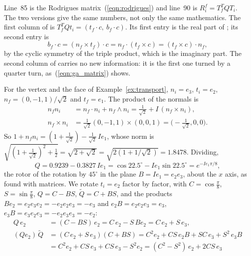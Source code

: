 Line~85 is the Rodrigues matrix~(\ref{eqn:rodrigues}) and line~90 is $R_i^f = T_f^T Q T_i$. The two versions give the same numbers, not only the same mathematics. The first column of  is $T_f^T Q t_i = (t_f\cdot c,\ b_f\cdot c)$. Its first entry is the real part of ; its second entry is
\begin{equation*}
b_f\cdot c = (n_f\times t_f)\cdot c = n_f\cdot(t_f\times c) = (t_f\times c)\cdot n_f ,
\end{equation*}
by the cyclic symmetry of the triple product, which is the imaginary part. The second column of  carries no new information: it is the first one turned by a quarter turn, as~(\ref{eqn:ga_matrix}) shows.

\begin{example}
\label{ex:ga_transport}
For the vertex and the face of Example~\ref{ex:transport}, $n_i = e_3$, $t_i = e_2$, $n_f = (0, -1, 1)/\sqrt 2$ and $t_f = e_1$. The product of the normals is
\begin{equation*}
\begin{aligned}
n_f n_i &= n_f \cdot n_i + n_f \wedge n_i = \tfrac{1}{\sqrt 2} + I\, (n_f \times n_i), \\
n_f \times n_i &= \tfrac1{\sqrt2}(0, -1, 1)\times(0, 0, 1) = \big(-\tfrac{1}{\sqrt 2}, 0, 0\big) .
\end{aligned}
\end{equation*}
So $1 + n_fn_i = (1 + \frac1{\sqrt2}) - \frac1{\sqrt2}\, Ie_1$, whose norm is $\sqrt{(1 + \frac1{\sqrt2})^2 + \frac12} = \sqrt{2 + \sqrt2} = \sqrt{2(1 + 1/\sqrt2)} = 1.8478$. Dividing,
\begin{equation*}
Q = 0.9239 - 0.3827\, I e_1 = \cos 22.5^\circ - I e_1 \sin 22.5^\circ = e^{-I e_1 \pi / 8} ,
\end{equation*}
the rotor of the rotation by $45^\circ$ in the plane $B = I e_1 = e_2 e_3$, about the $x$ axis, as found with matrices. We rotate $t_i = e_2$ factor by factor, with $C = \cos\frac\pi8$, $S = \sin\frac\pi8$, $Q = C - BS$, $\widetilde Q = C + BS$, and the products $Be_2 = e_2e_3e_2 = -e_2e_2e_3 = -e_3$ and $e_2B = e_2e_2e_3 = e_3$, $e_3B = e_3e_2e_3 = -e_2e_3e_3 = -e_2$:
\begin{align*}
Q\, e_2 &= (C - BS)\, e_2 = C\, e_2 - S\, B e_2 = C\, e_2 + S\, e_3 , \\
(Q e_2)\,\widetilde Q &= (C\, e_2 + S\, e_3)(C + BS) = C^2 e_2 + CS\, e_2 B + SC\, e_3 + S^2\, e_3 B \\
&= C^2 e_2 + CS\, e_3 + CS\, e_3 - S^2 e_2 = (C^2 - S^2)\, e_2 + 2CS\, e_3 \\

\end{align*}
\end{example}
